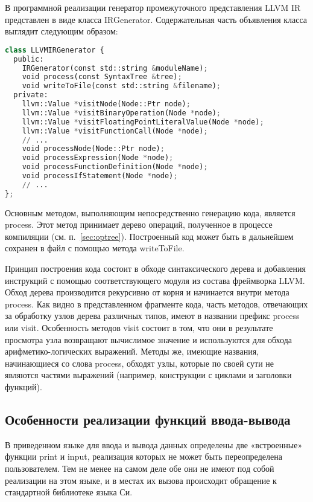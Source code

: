 В программной реализации генератор промежуточного представления LLVM IR представлен в виде класса IRGenerator.
Содержательная часть объявления класса выглядит следующим образом:

\begin{lstlisting}[language=Python, caption=Объявление класса LLVMIRGenerator]
class LLVMIRGenerator {
  public:
    IRGenerator(const std::string &moduleName);
    void process(const SyntaxTree &tree);
    void writeToFile(const std::string &filename);
  private:
    llvm::Value *visitNode(Node::Ptr node);
    llvm::Value *visitBinaryOperation(Node *node);
    llvm::Value *visitFloatingPointLiteralValue(Node *node);
    llvm::Value *visitFunctionCall(Node *node);
    // ...
    void processNode(Node::Ptr node);
    void processExpression(Node *node);
    void processFunctionDefinition(Node *node);
    void processIfStatement(Node *node);
    // ...
};
\end{lstlisting}

Основным методом, выполняющим непосредственно генерацию кода, является process.
Этот метод принимает дерево операций, полученное в процессе компиляции (см. п.~\ref{sec:optree}).
Построенный код может быть в дальнейшем сохранен в файл с помощью метода writeToFile.

Принцип построения кода состоит в обходе синтаксического дерева и добавления инструкций с помощью соответствующего модуля из состава фреймворка LLVM.
Обход дерева производится рекурсивно от корня и начинается внутри метода process.
Как видно в представленном фрагменте кода, часть методов, отвечающих за обработку узлов дерева различных типов, имеют в названии префикс process или visit.
Особенность методов visit состоит в том, что они в результате просмотра узла возвращают вычислимое значение и используются для обхода арифметико-логических выражений.
Методы же, имеющие названия, начинающиеся со слова process, обходят узлы, которые по своей сути не являются частями выражений (например, конструкции с циклами и заголовки функций).

\subsection{Особенности реализации функций ввода-вывода}

В приведенном языке для ввода и вывода данных определены две «встроенные» функции print и input, реализация которых не может быть переопределена пользователем.
Тем не менее на самом деле обе они не имеют под собой реализации на этом языке, и в местах их вызова происходит обращение к стандартной библиотеке языка Си.

